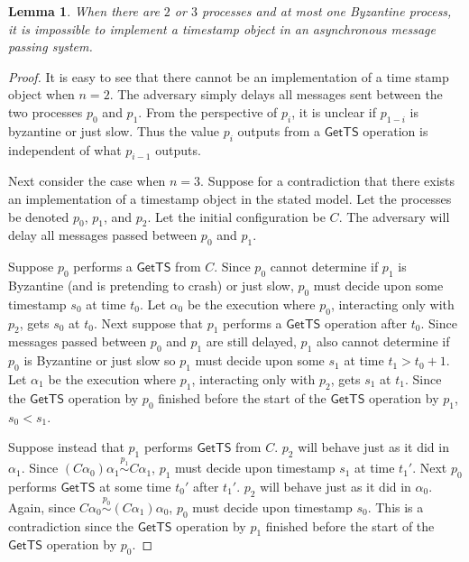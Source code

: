 \documentclass[11pt]{article}
\newcommand\GetTS{\mathsf{GetTS}}
\newtheorem{lemma}[theorem]{Lemma}
\begin{document}
\begin{lemma}
\label{lem:lowerbound}
When there are $2$ or $3$ processes and at most one Byzantine process, it is impossible to implement a timestamp object in an asynchronous message passing system.
\end{lemma}
\begin{proof}
It is easy to see that there cannot be an implementation of a time stamp object when $n = 2$. The adversary simply delays all messages sent between the two processes $p_0$ and $p_1$. From the perspective of $p_i$, it is unclear if $p_{1-i}$ is byzantine or just slow. Thus the value $p_i$ outputs from a $\GetTS$ operation is independent of what $p_{i-1}$ outputs.

Next consider the case when $n = 3$. Suppose for a contradiction that there exists an implementation of a timestamp object in the stated model. Let the processes be denoted $p_0$, $p_1$, and $p_2$. Let the initial configuration be $C$. The adversary will delay all messages passed between $p_0$ and $p_1$. 

Suppose $p_0$ performs a $\GetTS$ from $C$. Since $p_0$ cannot determine if $p_1$ is Byzantine (and is pretending to crash) or just slow, $p_0$ must decide upon some timestamp $s_0$ at time $t_0$. Let $\alpha_0$ be the execution where $p_0$, interacting only with $p_2$, gets $s_0$ at $t_0$. Next suppose that $p_1$ performs a $\GetTS$ operation after $t_0$. Since messages passed between $p_0$ and $p_1$ are still delayed, $p_1$ also cannot determine if $p_0$ is Byzantine or just slow so $p_1$ must decide upon some $s_1$ at time $t_1 > t_0 + 1$. Let $\alpha_1$ be the execution where $p_1$, interacting only with $p_2$, gets $s_1$ at $t_1$. Since the $\GetTS$ operation by $p_0$ finished before the start of the $\GetTS$ operation by $p_1$, $s_0 < s_1$. 

Suppose instead that $p_1$ performs $\GetTS$ from $C$. $p_2$ will behave just as it did in $\alpha_1$. Since $(C\alpha_0)\alpha_1 \stackrel{p_1}{\sim} C\alpha_1$, $p_1$ must decide upon timestamp $s_1$ at time $t_1'$. Next $p_0$ performs $\GetTS$ at some time $t_0'$ after $t_1'$. $p_2$ will behave just as it did in $\alpha_0$. Again, since $C\alpha_0 \stackrel{p_0}{\sim} (C\alpha_1)\alpha_0$, $p_0$ must decide upon timestamp $s_0$. This is a contradiction since the $\GetTS$ operation by $p_1$ finished before the start of the $\GetTS$ operation by $p_0$.     
\end{proof}

\end{document}
